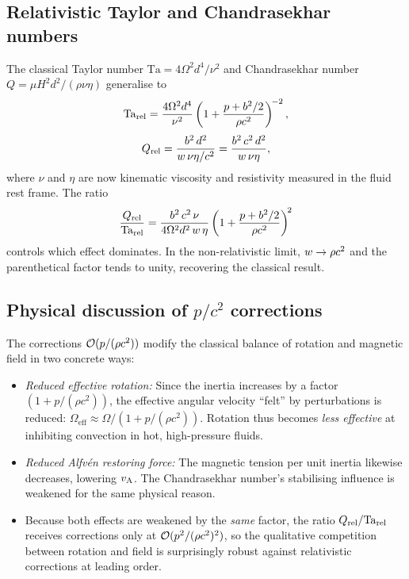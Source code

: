 \subsection{Relativistic Taylor and Chandrasekhar numbers}

The classical Taylor number $\mathrm{Ta}=4\Omega^{2}d^{4}/\nu^{2}$ and
Chandrasekhar number $Q=\mu H^{2}d^{2}/(\rho\nu\eta)$ generalise to
\begin{equation}
  \mathrm{Ta}_{\mathrm{rel}} = \frac{4\Omega^{2}d^{4}}{\nu^{2}}
    \left(1 + \frac{p + b^{2}/2}{\rho c^{2}}\right)^{\!-2},
  \label{eq:rel49-Ta}
\end{equation}
\begin{equation}
  Q_{\mathrm{rel}} = \frac{b^{2}\,d^{2}}{w\,\nu\eta/c^{2}}
    = \frac{b^{2}\,c^{2}\,d^{2}}{w\,\nu\eta},
  \label{eq:rel49-Q}
\end{equation}
where $\nu$ and $\eta$ are now kinematic viscosity and resistivity
measured in the fluid rest frame.  The ratio
\begin{equation}
  \frac{Q_{\mathrm{rel}}}{\mathrm{Ta}_{\mathrm{rel}}}
    = \frac{b^{2}\,c^{2}\,\nu}{4\Omega^{2}d^{2}\,w\,\eta}
    \left(1 + \frac{p + b^{2}/2}{\rho c^{2}}\right)^{\!2}
  \label{eq:rel49-ratio}
\end{equation}
controls which effect dominates.  In the non-relativistic limit,
$w\to\rho c^{2}$ and the parenthetical factor tends to unity,
recovering the classical result.

\subsection{Physical discussion of $p/c^{2}$ corrections}

The corrections $\mathcal{O}(p/(\rho c^{2}))$ modify the classical balance
of rotation and magnetic field in two concrete ways:
\begin{itemize}
\item \emph{Reduced effective rotation:} Since the inertia increases
  by a factor $(1+p/(\rho c^{2}))$, the effective angular velocity
  ``felt'' by perturbations is reduced:
  $\Omega_{\text{eff}}\approx\Omega/(1+p/(\rho c^{2}))$.  Rotation
  thus becomes \emph{less effective} at inhibiting convection in hot,
  high-pressure fluids.
\item \emph{Reduced Alfv\'en restoring force:} The magnetic tension per
  unit inertia likewise decreases, lowering $v_{\mathrm{A}}$.  The Chandrasekhar
  number's stabilising influence is weakened for the same physical
  reason.
\item Because both effects are weakened by the \emph{same} factor, the
  ratio $Q_{\mathrm{rel}}/\mathrm{Ta}_{\mathrm{rel}}$ receives corrections only at
  $\mathcal{O}(p^{2}/(\rho c^{2})^{2})$, so the qualitative competition
  between rotation and field is surprisingly robust against relativistic
  corrections at leading order.
\end{itemize}

